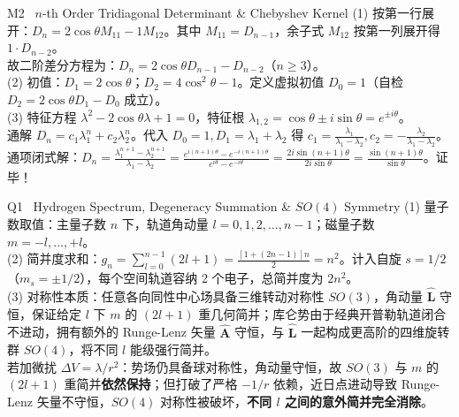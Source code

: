 \documentclass[a4paper,11pt]{article}
\begin{document}
\vspace{1.5pt}

\begin{solution}{M2 \textperiodcentered\ $n$-th Order Tridiagonal Determinant \& Chebyshev Kernel}
\small
(1) 按第一行展开：$D_n = 2\cos\theta M_{11} - 1 M_{12}$。其中 $M_{11} = D_{n-1}$，余子式 $M_{12}$ 按第一列展开得 $1\cdot D_{n-2}$。\\
故二阶差分方程为：$D_n = 2\cos\theta D_{n-1} - D_{n-2}$（$n \ge 3$）。\\
(2) 初值：$D_1 = 2\cos\theta$；$D_2 = 4\cos^2\theta - 1$。定义虚拟初值 $D_0 = 1$（自检 $D_2 = 2\cos\theta D_1 - D_0$ 成立）。\\
(3) 特征方程 $\lambda^2 - 2\cos\theta\lambda + 1 = 0$，特征根 $\lambda_{1,2} = \cos\theta \pm i\sin\theta = e^{\pm i\theta}$。\\
通解 $D_n = c_1 \lambda_1^n + c_2 \lambda_2^n$。代入 $D_0=1, D_1=\lambda_1+\lambda_2$ 得 $c_1 = \frac{\lambda_1}{\lambda_1-\lambda_2}, c_2 = -\frac{\lambda_2}{\lambda_1-\lambda_2}$。\\
通项闭式解：$D_n = \frac{\lambda_1^{n+1} - \lambda_2^{n+1}}{\lambda_1 - \lambda_2} = \frac{e^{i(n+1)\theta} - e^{-i(n+1)\theta}}{e^{i\theta} - e^{-i\theta}} = \frac{2i\sin(n+1)\theta}{2i\sin\theta} = \frac{\sin(n+1)\theta}{\sin\theta}$。证毕！
\end{solution}

\vspace{1.5pt}

\begin{solution}{Q1 \textperiodcentered\ Hydrogen Spectrum, Degeneracy Summation \& $SO(4)$ Symmetry}
\small
(1) 量子数取值：主量子数 $n$ 下，轨道角动量 $l = 0, 1, 2, \dots, n-1$；磁量子数 $m = -l, \dots, +l$。\\
(2) 简并度求和：$g_n = \sum_{l=0}^{n-1} (2l+1) = \frac{[1+(2n-1)]n}{2} = n^2$。计入自旋 $s=1/2$（$m_s = \pm 1/2$），每个空间轨道容纳 2 个电子，总简并度为 $2n^2$。\\
(3) 对称性本质：任意各向同性中心场具备三维转动对称性 $SO(3)$，角动量 $\hat{\mathbf{L}}$ 守恒，保证给定 $l$ 下 $m$ 的 $(2l+1)$ 重几何简并；库仑势由于经典开普勒轨道闭合不进动，拥有额外的 Runge-Lenz 矢量 $\hat{\mathbf{A}}$ 守恒，与 $\hat{\mathbf{L}}$ 一起构成更高阶的四维旋转群 $SO(4)$，将不同 $l$ 能级强行简并。\\
若加微扰 $\Delta V = \lambda/r^2$：势场仍具备球对称性，角动量守恒，故 $SO(3)$ 与 $m$ 的 $(2l+1)$ 重简并\textbf{依然保持}；但打破了严格 $-1/r$ 依赖，近日点进动导致 Runge-Lenz 矢量不守恒，$SO(4)$ 对称性被破坏，\textbf{不同 $l$ 之间的意外简并完全消除}。
\end{solution}
\end{document}
